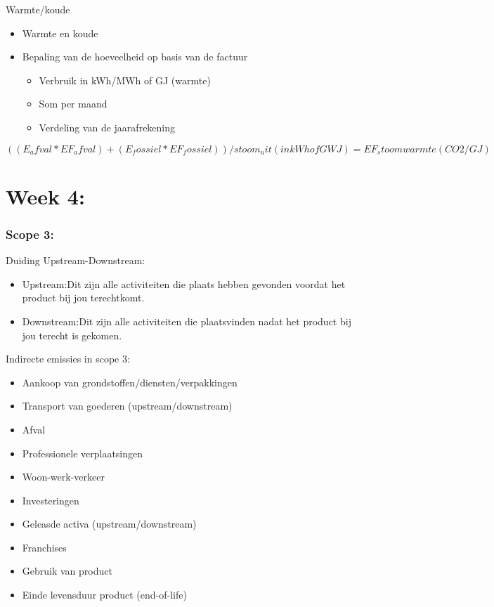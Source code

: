 \documentclass[12pt]{article}
\begin{document}
Warmte/koude\begin{itemize}
    \item Warmte en koude
    \item Bepaling van de hoeveelheid op basis van de factuur\begin{itemize}
        \item Verbruik in kWh/MWh of GJ (warmte)
        \item Som per maand
        \item Verdeling van de jaarafrekening
    \end{itemize}
\end{itemize}
$((E_afval*EF_afval)+(E_fossiel*EF_fossiel))/stoom_uit (in kWh of GWJ)=EF_stoom warmte (CO2/GJ)$
\section{Week 4:}
\subsubsection{Scope 3:}
Duiding Upstream-Downstream:\begin{itemize}
    \item Upstream:Dit zijn alle activiteiten die plaats hebben gevonden voordat het product bij jou
    terechtkomt.
    \item Downstream:Dit zijn alle activiteiten die plaatsvinden nadat het product bij jou terecht is
    gekomen.    
\end{itemize}
Indirecte emissies in scope 3:\begin{itemize}
    \item Aankoop van grondstoffen/diensten/verpakkingen
    \item Transport van goederen (upstream/downstream)
    \item Afval
    \item Professionele verplaatsingen
    \item Woon-werk-verkeer
    \item Investeringen
    \item Geleasde activa (upstream/downstream)
    \item Franchises
    \item Gebruik van product
    \item Einde levensduur product (end-of-life)
\end{itemize}
\end{document}
